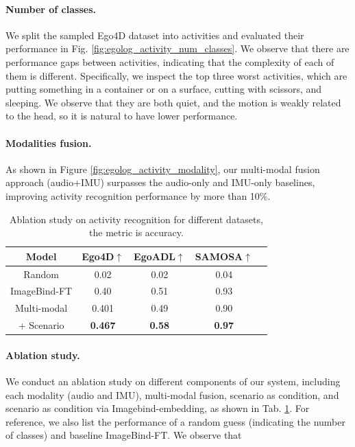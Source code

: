 \paragraph{Number of classes.}
We split the sampled Ego4D dataset into activities and evaluated their performance in Fig. \ref{fig:egolog_activity_num_classes}. We observe that there are performance gaps between activities, indicating that the complexity of each of them is different. Specifically, we inspect the top three worst activities, which are putting something in a container or on a surface, cutting with scissors, and sleeping. We observe that they are both quiet, and the motion is weakly related to the head, so it is natural to have lower performance.

\paragraph{Modalities fusion.}
As shown in Figure \ref{fig:egolog_activity_modality}, our multi-modal fusion approach (audio+IMU) surpasses the audio-only and IMU-only baselines, improving activity recognition performance by more than 10\%.


\begin{table}[h]
\centering
\caption{Ablation study on activity recognition for different datasets, the metric is accuracy.}
\label{tab:ab_activity}
\begin{tabular}{ccccc}
\toprule
\textbf{Model}  & \textbf{Ego4D$\uparrow$} & \textbf{EgoADL$\uparrow$} & \textbf{SAMOSA$\uparrow$} \\
\midrule
Random  & 0.02 & 0.02 & 0.04 \\
\midrule
ImageBind-FT  & 0.40 & 0.51 & 0.93 \\
\midrule
Multi-modal & 0.401 & 0.49 & 0.90\\
+ Scenario & \textbf{0.467} & \textbf{0.58} & \textbf{0.97} \\
\bottomrule
\end{tabular}
\end{table}

\paragraph{Ablation study.}
We conduct an ablation study on different components of our system, including each modality (audio and IMU), multi-modal fusion, scenario as condition, and scenario as condition via Imagebind-embedding, as shown in Tab. \ref{tab:ab_activity}. For reference, we also list the performance of a random guess (indicating the number of classes) and baseline ImageBind-FT.
We observe that


